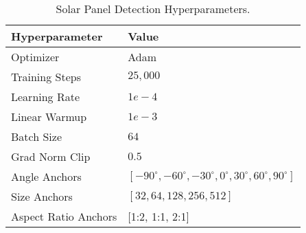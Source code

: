 \begin{table}[ht!]
\centering
\begin{tabular}{@{}ll@{}}
\toprule
\textbf{Hyperparameter} &
\textbf{Value} \\ 
\midrule
Optimizer      &Adam \\
Training Steps &$25,000$ \\
Learning Rate  &$1e-4$ \\
Linear Warmup  &$1e-3$ \\
Batch Size     &$64$ \\
Grad Norm Clip &$0.5$ \\
Angle Anchors  &$[-90^{\circ}, -60^{\circ}, -30^{\circ}, 0^{\circ}, 30^{\circ}, 60^{\circ}, 90^{\circ}]$ \\
Size Anchors   &$[32, 64, 128, 256, 512]$ \\
Aspect Ratio Anchors  &[1:2, 1:1, 2:1] \\
\bottomrule
\end{tabular}
\caption{Solar Panel Detection Hyperparameters.}
\label{tab:hyperparameters}
\end{table}
